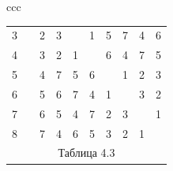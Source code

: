 \begin{center}
\begin{tabular}{ccc}
\begin{tabular}{cccccccccc}
3 & \vline & 2 & 3 & \ & 1 & 5 & 7 & 4 & 6 \\


4 & \vline & 3 & 2 & 1 & \ & 6 & 4 & 7 & 5 \\


5 & \vline & 4 & 7 & 5 & 6 & \ & 1 & 2 & 3 \\


6 & \vline & 5 & 6 & 7 & 4 & 1 & \ & 3 & 2 \\


7 & \vline & 6 & 5 & 4 & 7 & 2 & 3 & \ & 1 \\


8 & \vline & 7 & 4 & 6 & 5 & 3 & 2 & 1 & \ \\


\multicolumn{10}{c}{ Таблица 4.3}


\end{tabular}





\end{tabular}


\end{center}


\smallskip










